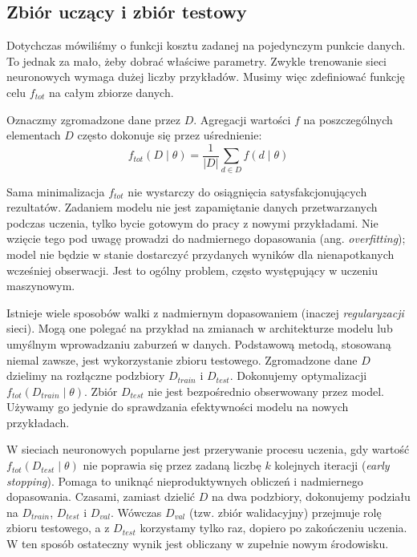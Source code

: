 
\subsection{Zbiór uczący i zbiór testowy} \label{testset}

Dotychczas mówiliśmy o funkcji kosztu zadanej na pojedynczym punkcie danych. To jednak za mało, żeby dobrać właściwe parametry. Zwykle trenowanie sieci neuronowych wymaga dużej liczby przykładów. Musimy więc zdefiniować funkcję celu $f_{tot}$ na całym zbiorze danych.

Oznaczmy zgromadzone dane przez $D$. Agregacji wartości $f$ na poszczególnych elementach $D$ często dokonuje się przez uśrednienie:
\[f_{tot}(D \mid \theta) = \frac{1}{|D|} \sum\limits_{d \in D} f(d \mid \theta)\]

Sama minimalizacja $f_{tot}$ nie wystarczy do osiągnięcia satysfakcjonujących rezultatów. Zadaniem modelu nie jest zapamiętanie danych przetwarzanych podczas uczenia, tylko bycie gotowym do pracy z nowymi przykładami. Nie wzięcie tego pod uwagę prowadzi do nadmiernego dopasowania (ang. \textit{overfitting}); model nie będzie w stanie dostarczyć przydanych wyników dla nienapotkanych wcześniej obserwacji. Jest to ogólny problem, często występujący w uczeniu maszynowym.

Istnieje wiele sposobów walki z nadmiernym dopasowaniem (inaczej \textit{regularyzacji} sieci). Mogą one polegać na przykład na zmianach w architekturze modelu lub umyślnym wprowadzaniu zaburzeń w danych. Podstawową metodą, stosowaną niemal zawsze, jest wykorzystanie zbioru testowego. Zgromadzone dane $D$ dzielimy na rozłączne podzbiory $D_{train}$ i $D_{test}$. Dokonujemy optymalizacji $f_{tot}(D_{train} \mid \theta)$. Zbiór $D_{test}$ nie jest bezpośrednio obserwowany przez model. Używamy go jedynie do sprawdzania efektywności modelu na nowych przykładach.

W sieciach neuronowych popularne jest przerywanie procesu uczenia, gdy wartość $f_{tot}(D_{test} \mid \theta)$ nie poprawia się przez zadaną liczbę $k$ kolejnych iteracji (\textit{early stopping}\label{earlys}). Pomaga to uniknąć nieproduktywnych obliczeń i nadmiernego dopasowania. Czasami, zamiast dzielić $D$ na dwa podzbiory, dokonujemy podziału na $D_{train}$, $D_{test}$ i $D_{val}$. Wówczas $D_{val}$ (tzw. zbiór walidacyjny) przejmuje rolę zbioru testowego, a z $D_{test}$ korzystamy tylko raz, dopiero po zakończeniu uczenia. W ten sposób ostateczny wynik jest obliczany w zupełnie nowym środowisku.

